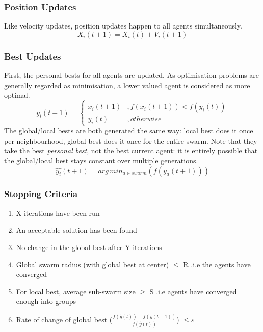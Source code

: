 \subsubsection{Position Updates}
Like velocity updates, position updates happen to all agents simultaneously.
\begin{equation}
    X_i(t+1) = X_i(t) + V_i(t+1)
\end{equation}

\subsubsection{Best Updates}
First, the personal bests for all agents are updated. As optimisation problems are generally regarded as minimisation, a lower valued agent is considered as more optimal.
\begin{equation}
    y_i(t+1) =
    \begin{cases}
        x_i(t+1) &, f(x_i(t+1)) < f(y_i(t)) \\
        y_i(t) &, otherwise
    \end{cases}
\end{equation}
The global/local bests are both generated the same way: local best does it once per neighbourhood, global best does it once for the entire swarm. Note that they take the best \emph{personal best}, not the best current agent: it is entirely possible that the global/local best stays constant over multiple generations.
\begin{equation}
    \hat{y_i}(t+1) = arg\, min_{a  \in swarm}(f(y_a(t+1)))
\end{equation}

\subsubsection{Stopping Criteria}
\begin{enumerate}
    \item X iterations have been run
    \item An acceptable solution has been found
    \item No change in the global best after Y iterations
    \item Global swarm radius (with global best at center) $\leq$ R .i.e the agents have converged 
    \item For local best, average sub-swarm size $\geq$ S .i.e agents have converged enough into groups
    \item Rate of change of global best (\(\frac{f(\hat{y}(t)) - f(\hat{y}(t-1))}{f(\hat{y}(t))}\)) $\leq \varepsilon$
\end{enumerate}

